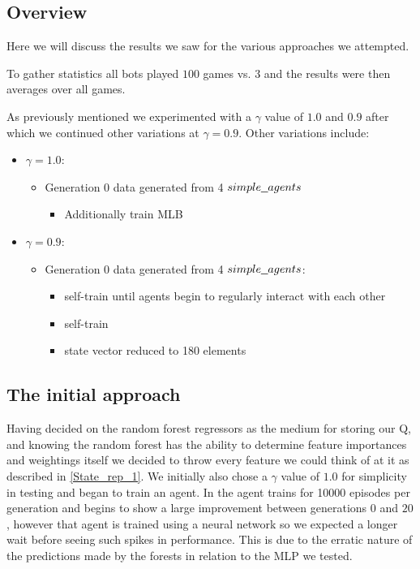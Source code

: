 \subsection{Overview}
Here we will discuss the results we saw for the various approaches we attempted.

To gather statistics all bots played $100$ games vs. $3$  and the results were then averages over all games.

As previously mentioned we experimented with a $\gamma$ value of $1.0$ and $0.9$ after which we continued other variations at $\gamma = 0.9$.
Other variations include:
\begin{itemize}
	\item $\gamma = 1.0$:
	\begin{itemize}
		\item Generation 0 data generated from 4 $\code{simple\_agents}$
		\begin{itemize}
			\item Additionally train MLB
		\end{itemize}
	\end{itemize}
	\item $\gamma = 0.9$:
	\begin{itemize}
		\item Generation 0 data generated from 4 $\code{simple\_agents}$:
		\begin{itemize}
			\item self-train until agents begin to regularly interact with each other
			\item self-train
			\item state vector reduced to 180 elements
		\end{itemize}
	\end{itemize}
\end{itemize}

\subsection{The initial approach}
Having decided on the random forest regressors as the medium for storing our Q, and knowing the random forest has the ability to determine feature importances and weightings itself we decided to throw every feature we could think of at it as described in \ref{State_rep_1}. We initially also chose a $\gamma$ value of $1.0$ for simplicity in testing and began to train an agent. In \cite{paper} the agent trains for 10000 episodes per generation and begins to show a large improvement between generations $0$ and $20$, however that agent is trained using a neural network so we expected a longer wait before seeing such spikes in performance. This is due to the erratic nature of the predictions made by the forests in relation to the MLP we tested.


